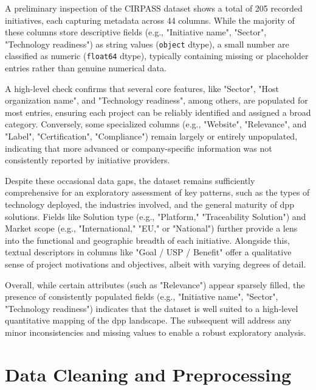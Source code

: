 A preliminary inspection of the CIRPASS dataset shows a total of 205 recorded initiatives, each capturing metadata across 44 columns. While the majority of these columns store descriptive fields (e.g., "Initiative name", "Sector", "Technology readiness") as string values (\verb|object| dtype), a small number are classified as numeric (\verb|float64| dtype), typically containing missing or placeholder entries rather than genuine numerical data.

A high-level check confirms that several core features, like "Sector", "Host organization name", and "Technology readiness", among others, are populated for most entries, ensuring each project can be reliably identified and assigned a broad category. Conversely, some specialized columns (e.g., "Website", "Relevance", and "Label", "Certification", "Compliance") remain largely or entirely unpopulated, indicating that more advanced or company-specific information was not consistently reported by initiative providers.

Despite these occasional data gaps, the dataset remains sufficiently comprehensive for an exploratory assessment of key patterns, such as the types of technology deployed, the industries involved, and the general maturity of \ac{dpp} solutions. Fields like Solution type (e.g., "Platform," "Traceability Solution") and Market scope (e.g., "International," "EU," or "National") further provide a lens into the functional and geographic breadth of each initiative. Alongside this, textual descriptors in columns like "Goal / USP / Benefit" offer a qualitative sense of project motivations and objectives, albeit with varying degrees of detail.

Overall, while certain attributes (such as "Relevance") appear sparsely filled, the presence of consistently populated fields (e.g., "Initiative name", "Sector", "Technology readiness") indicates that the dataset is well suited to a high-level quantitative mapping of the \ac{dpp} landscape. The subsequent  will address any minor inconsistencies and missing values to enable a robust exploratory analysis.

\section{Data Cleaning and Preprocessing}
\label{sec:data_cleaning_preprocessing}

